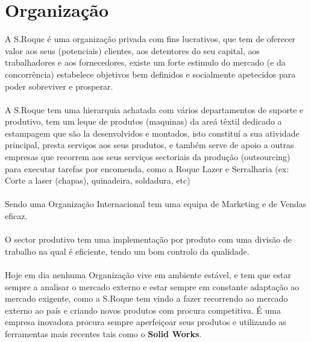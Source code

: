 {\newpage
\section{Organização}
\qquad A S.Roque é uma organização privada com fins lucrativos, que tem de oferecer valor aos seus (potenciais) clientes, aos detentores do seu capital, aos trabalhadores e aos fornecedores, existe um forte estimulo do mercado (e da concorrência) estabelece objetivos bem definidos e socialmente apetecidos para poder sobreviver e prosperar.\\
\\
A S.Roque tem uma hierarquia achatada com vários departamentos de suporte e produtivo, tem um leque de produtos (maquinas) da areá têxtil dedicado a estampagem que são la desenvolvidos e montados, isto constituí a sua atividade principal, presta serviços aos seus produtos, e também serve de apoio a outras empresas que recorrem aos seus serviços sectoriais da produção (outsourcing) para executar tarefas por encomenda, como a Roque Lazer e Serralharia (ex: Corte a laser (chapas), quinadeira, soldadura, etc)\\
\\
Sendo uma Organização Internacional tem uma equipa de Marketing e de Vendas eficaz.\\
\\
O sector produtivo tem uma implementação por produto com uma divisão de trabalho na qual é eficiente, tendo um bom controlo da qualidade.\\
\\
Hoje em dia nenhuma Organização vive em ambiente estável, e tem que estar sempre a analisar o mercado externo e estar sempre em constante adaptação ao mercado exigente, como a S.Roque tem vindo a fazer recorrendo ao mercado externo ao país e criando novos produtos com procura competitiva. É uma empresa inovadora procura sempre aperfeiçoar seus produtos e utilizando as ferramentas mais recentes tais como o \textbf{Solid Works}.\\





}
